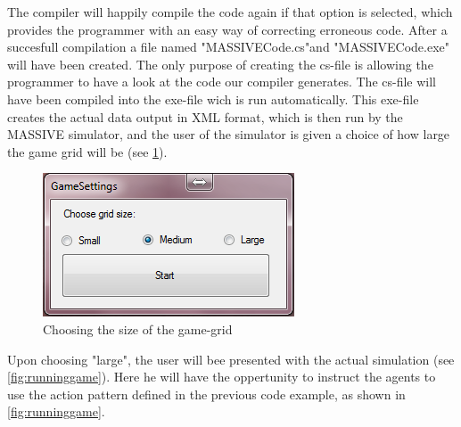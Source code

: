 The compiler will happily compile the code again if that option is selected, which provides the programmer with an easy way of correcting erroneous code. After a succesfull compilation a file named "MASSIVECode.cs"and "MASSIVECode.exe" will have been created. The only purpose of creating the cs-file is allowing the programmer to have a look at the code our compiler generates. The cs-file will have been compiled into the exe-file wich is run automatically. This exe-file creates the actual data output in XML format, which is then run by the MASSIVE simulator, and the user of the simulator is given a choice of how large the game grid will be (see \ref{fig:game_promt}).

\begin{figure}[h]%
\begin{center}
\includegraphics[width=\columnwidth]{Images/massive_dialog.png}%
\end{center}
\caption{Choosing the size of the game-grid}%
\label{fig:game_promt}%
\end{figure}

Upon choosing "large", the user will bee presented with the actual simulation (see \ref{fig:runninggame}). Here he will have the oppertunity to instruct the agents to use the action pattern defined in the previous code example, as shown in \ref{fig:runninggame}.

